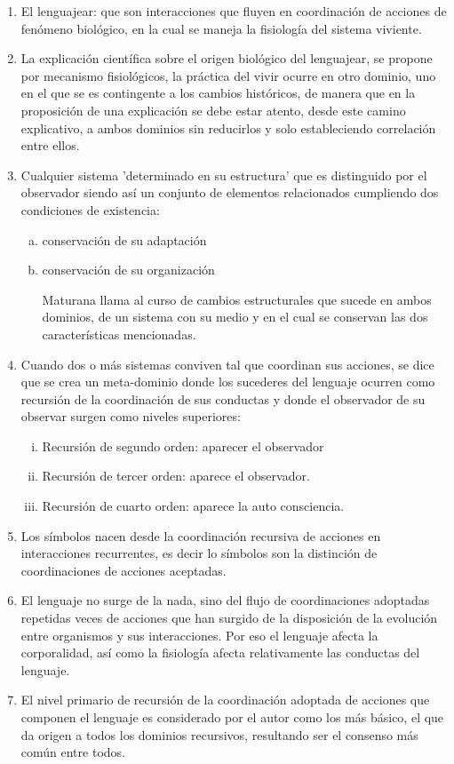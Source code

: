 \documentclass[10pt]{article}
\begin{document}
        \begin{enumerate}
            \item El lenguajear: que son interacciones que fluyen en coordinación de acciones de fenómeno biológico, en la cual se maneja la fisiología del sistema viviente.
            \item La explicación científica sobre el origen biológico del lenguajear, se propone por mecanismo fisiológicos, la práctica del vivir ocurre en otro dominio, uno en el que se es contingente a los cambios históricos, de manera que en la proposición de una explicación se debe estar atento, desde este camino explicativo, a ambos dominios sin reducirlos y solo estableciendo correlación entre ellos.
            \item Cualquier sistema 'determinado en su estructura' que es distinguido por el observador siendo así un conjunto de elementos relacionados cumpliendo dos condiciones de existencia: 
            \begin{enumerate}[a.]
                \item conservación de su adaptación 
                \item conservación de su organización
                
                Maturana llama al curso de cambios estructurales que sucede en ambos dominios, de un sistema con su medio y en el cual se conservan las dos características mencionadas.
            \end{enumerate}
            \item Cuando dos o más sistemas conviven tal que coordinan sus acciones, se dice que se crea un meta-dominio donde los sucederes del lenguaje ocurren como recursión de la coordinación de sus conductas y donde el observador de su observar surgen como niveles superiores:
            \begin{enumerate}[i.]
                \item Recursión de segundo orden: aparecer el observador
                \item Recursión de tercer orden: aparece el observador.
                \item Recursión de cuarto orden: aparece la auto consciencia.
            \end{enumerate}
            \item Los símbolos nacen desde la coordinación recursiva de acciones en interacciones recurrentes, es decir lo símbolos son la distinción de coordinaciones de acciones aceptadas.
            \item El lenguaje no surge de la nada, sino del flujo de coordinaciones adoptadas repetidas veces de acciones que han surgido de la disposición de la evolución entre organismos y sus interacciones. Por eso el lenguaje afecta la corporalidad, así como la fisiología afecta relativamente las conductas del lenguaje.
            \item El nivel primario de recursión de la coordinación adoptada de acciones que componen el lenguaje es considerado por el autor como los más básico, el que da origen a todos los dominios recursivos, resultando ser el consenso más común entre todos.
        \end{enumerate}
\end{document}
